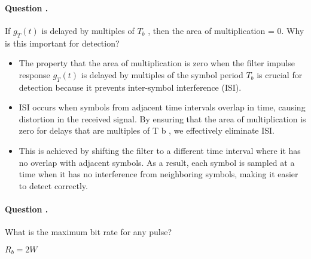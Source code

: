 \documentclass[14pt,a4paper]{report}
\newcounter{question}
\newcommand*\question{%
\stepcounter{question}%
\paragraph{Question \thesection.\thequestion}}
\begin{document}
\question
{
    If $g_T (t)$ is delayed by multiples of $T_b$ , then the area of multiplication = 0. Why is this important for detection?
}
\begin{answer_box*}
\begin{itemize}
    \item The property that the area of multiplication is zero when the filter impulse response $g_T (t)$ is delayed by multiples of the symbol period $T_b$ is crucial for detection because it prevents inter-symbol interference (ISI).

    \item ISI occurs when symbols from adjacent time intervals overlap in time, causing distortion in the received signal. By ensuring that the area of multiplication is zero for delays that are multiples of T b , we effectively eliminate ISI.
    
    \item This is achieved by shifting the filter to a different time interval where it has no overlap with adjacent symbols. As a result, each symbol is sampled at a time when it has no interference from neighboring symbols, making it easier to detect correctly.
\end{itemize}
\end{answer_box*}

\question
{
    What is the maximum bit rate for any pulse?
}
\begin{answer_box*}
    $R_b = 2W$
\end{answer_box*}
\end{document}
